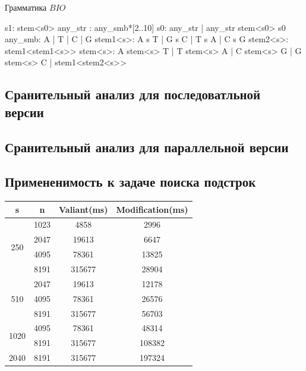 \documentclass[14pt]{matmex-diploma-custom}
\begin{document}
\begin{listing}[h]
\caption{Грамматика $BIO$}
\begin{pyglist}[]
            s1: stem<s0>
            any_str : any_smb*[2..10]
            s0: any_str | any_str stem<s0> s0
            any_smb: A | T | C | G
            stem1<s>: A s T | G s C | T s A | C s G 
            stem2<s>: stem1<stem1<s>>
            stem<s>:  
                  A stem<s> T 
                | T stem<s> A 
                | C stem<s> G 
                | G stem<s> C 
                | stem1<stem2<s>>  
\end{pyglist}
\label{bio}
\end{listing}

\subsection{Сранительный анализ для последоватльной версии}

\subsection{Сранительный анализ для параллельной версии}

\subsection{Примененимость к задаче поиска подстрок}

    \begin{center}
        \begin{tabular}{ |c|c|c|c| } 
        \hline
        s & n & Valiant(ms) &  Modification(ms) \\
        \hline
        \multirow{4}{2em}{250} & 1023 & 4858 & 2996 \\ 
        & 2047 & 19613 & 6647 \\ 
        & 4095 & 78361 & 13825 \\ 
        & 8191 & 315677 & 28904 \\ 
        \hline
        \multirow{3}{2em}{510} & 2047 & 19613 & 12178 \\
        & 4095 & 78361 & 26576 \\
        & 8191 & 315677 & 56703 \\
        \hline
        \multirow{2}{2em}{1020} & 4095 & 78361 & 48314 \\
        & 8191 & 315677 & 108382 \\
        \hline
        \multirow{1}{2em}{2040} & 8191 & 315677 & 197324 \\
        \hline
        \end{tabular}
    \end{center}
\end{document}
